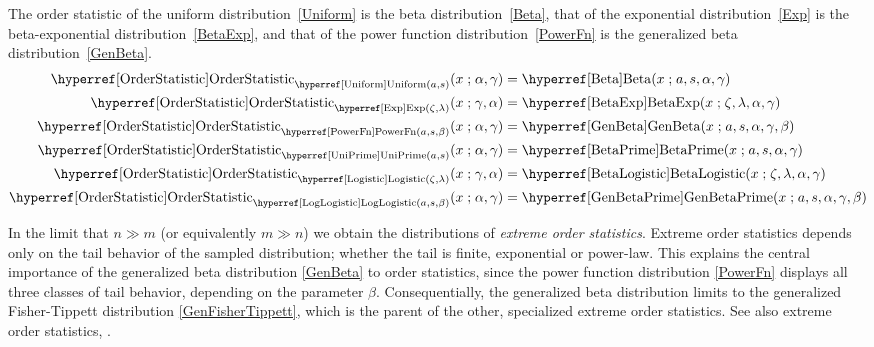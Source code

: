 The order statistic of the uniform distribution~\eqref{Uniform} is the beta distribution~\eqref{Beta}, that of the exponential distribution~\eqref{Exp} is the beta-exponential distribution~\eqref{BetaExp}, and that of the  power function distribution~\eqref{PowerFn} is the generalized beta distribution~\eqref{GenBeta}.
\begin{align*}
\opr{OrderStatistic}_{\opr{Uniform}(a,s)}(x \given \alpha, \gamma)
 & = 
 \opr{Beta}(x\given a, s, \alpha, \gamma) 
\checked
\\
\opr{OrderStatistic}_{\opr{Exp}(\pLoc,\pScale)}  (x \given  \gamma, \alpha) 
& = \opr{BetaExp}(x\given \pLoc, \pScale,  \alpha, \gamma) 
\checked
\\
\opr{OrderStatistic}_{\opr{PowerFn}(a,s,\beta)} (x \given \alpha, \gamma) 
&= \opr{GenBeta}(x\given a, s,\alpha, \gamma, \beta) 
\checked
\\
\opr{OrderStatistic}_{\opr{UniPrime}(a,s)}(x \given \alpha, \gamma)
&=  \opr{BetaPrime}(x\given a, s, \alpha, \gamma) 
\checked
\\
\opr{OrderStatistic}_{\opr{Logistic}(\pLoc,\pScale)}  (x \given  \gamma, \alpha)
&=  \opr{BetaLogistic}(x\given \pLoc, \pScale, \alpha, \gamma)
\checked
\\
 \opr{OrderStatistic}_{\opr{LogLogistic}(a,s,\beta)}(x \given \alpha, \gamma ) 
& =  \opr{GenBetaPrime}(x\given a, s, \alpha, \gamma , \beta) 
\checked
\end{align*}




In the limit that $n\gg m$ (or equivalently $m\gg n$) we obtain the distributions of {\it extreme order statistics}. Extreme order statistics depends only on the tail behavior of the sampled distribution; whether the tail is finite, exponential or power-law. This explains the central importance of the generalized beta distribution \eqref{GenBeta} to order statistics, since the power function distribution \eqref{PowerFn} displays all three classes of tail behavior, depending on the parameter $\beta$. Consequentially, the generalized beta distribution limits to the generalized Fisher-Tippett distribution \eqref{GenFisherTippett}, which is the parent of the other, specialized extreme order statistics. See also extreme order statistics, .


